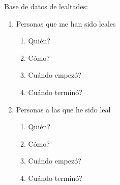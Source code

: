 \documentclass[./informes.tex]{subfiles}
\begin{document}
Base de datos de lealtades:

\begin{enumerate}
  \item Personas que me han sido leales
    \begin{enumerate}
      \item Quién?
      \item Cómo?
      \item Cuándo empezó?
      \item Cuándo terminó?
    \end{enumerate}
  \item Personas a las que he sido leal
    \begin{enumerate}
      \item Quién?
      \item Cómo?
      \item Cuándo empezó?
      \item Cuándo terminó?
    \end{enumerate}
\end{enumerate}
\end{document}
